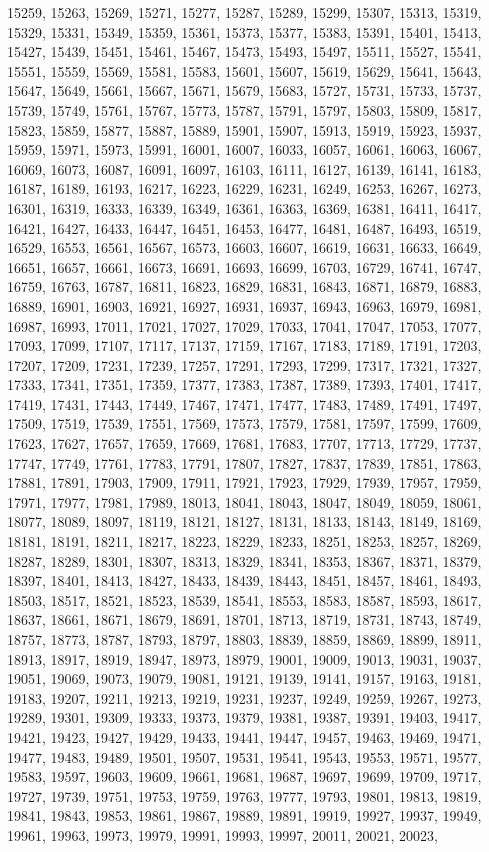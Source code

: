 \documentclass[10pt,twocolumn]{article}
\begin{document}
\begin{thebibliography}{9}
15259, 15263, 15269, 15271, 15277, 15287, 15289, 15299, 15307, 15313, 15319, 15329, 15331, 15349, 15359, 15361, 15373, 15377, 15383, 15391, 15401, 15413, 15427, 15439, 15451, 15461, 15467, 15473, 15493, 15497, 15511, 15527, 15541, 15551, 15559, 15569, 15581, 15583, 15601, 15607, 15619, 15629, 15641, 15643, 15647, 15649, 15661, 15667, 15671, 15679, 15683, 15727, 15731, 15733, 15737, 15739, 15749, 15761, 15767, 15773, 15787, 15791, 15797, 15803, 15809, 15817, 15823, 15859, 15877, 15887, 15889, 15901, 15907, 15913, 15919, 15923, 15937, 15959, 15971, 15973, 15991, 16001, 16007, 16033, 16057, 16061, 16063, 16067, 16069, 16073, 16087, 16091, 16097, 16103, 16111, 16127, 16139, 16141, 16183, 16187, 16189, 16193, 16217, 16223, 16229, 16231, 16249, 16253, 16267, 16273, 16301, 16319, 16333, 16339, 16349, 16361, 16363, 16369, 16381, 16411, 16417, 16421, 16427, 16433, 16447, 16451, 16453, 16477, 16481, 16487, 16493, 16519, 16529, 16553, 16561, 16567, 16573, 16603, 16607, 16619, 16631, 16633, 16649, 16651, 16657, 16661, 16673, 16691, 16693, 16699, 16703, 16729, 16741, 16747, 16759, 16763, 16787, 16811, 16823, 16829, 16831, 16843, 16871, 16879, 16883, 16889, 16901, 16903, 16921, 16927, 16931, 16937, 16943, 16963, 16979, 16981, 16987, 16993, 17011, 17021, 17027, 17029, 17033, 17041, 17047, 17053, 17077, 17093, 17099, 17107, 17117, 17137, 17159, 17167, 17183, 17189, 17191, 17203, 17207, 17209, 17231, 17239, 17257, 17291, 17293, 17299, 17317, 17321, 17327, 17333, 17341, 17351, 17359, 17377, 17383, 17387, 17389, 17393, 17401, 17417, 17419, 17431, 17443, 17449, 17467, 17471, 17477, 17483, 17489, 17491, 17497, 17509, 17519, 17539, 17551, 17569, 17573, 17579, 17581, 17597, 17599, 17609, 17623, 17627, 17657, 17659, 17669, 17681, 17683, 17707, 17713, 17729, 17737, 17747, 17749, 17761, 17783, 17791, 17807, 17827, 17837, 17839, 17851, 17863, 17881, 17891, 17903, 17909, 17911, 17921, 17923, 17929, 17939, 17957, 17959, 17971, 17977, 17981, 17989, 18013, 18041, 18043, 18047, 18049, 18059, 18061, 18077, 18089, 18097, 18119, 18121, 18127, 18131, 18133, 18143, 18149, 18169, 18181, 18191, 18211, 18217, 18223, 18229, 18233, 18251, 18253, 18257, 18269, 18287, 18289, 18301, 18307, 18313, 18329, 18341, 18353, 18367, 18371, 18379, 18397, 18401, 18413, 18427, 18433, 18439, 18443, 18451, 18457, 18461, 18493, 18503, 18517, 18521, 18523, 18539, 18541, 18553, 18583, 18587, 18593, 18617, 18637, 18661, 18671, 18679, 18691, 18701, 18713, 18719, 18731, 18743, 18749, 18757, 18773, 18787, 18793, 18797, 18803, 18839, 18859, 18869, 18899, 18911, 18913, 18917, 18919, 18947, 18973, 18979, 19001, 19009, 19013, 19031, 19037, 19051, 19069, 19073, 19079, 19081, 19121, 19139, 19141, 19157, 19163, 19181, 19183, 19207, 19211, 19213, 19219, 19231, 19237, 19249, 19259, 19267, 19273, 19289, 19301, 19309, 19333, 19373, 19379, 19381, 19387, 19391, 19403, 19417, 19421, 19423, 19427, 19429, 19433, 19441, 19447, 19457, 19463, 19469, 19471, 19477, 19483, 19489, 19501, 19507, 19531, 19541, 19543, 19553, 19571, 19577, 19583, 19597, 19603, 19609, 19661, 19681, 19687, 19697, 19699, 19709, 19717, 19727, 19739, 19751, 19753, 19759, 19763, 19777, 19793, 19801, 19813, 19819, 19841, 19843, 19853, 19861, 19867, 19889, 19891, 19919, 19927, 19937, 19949, 19961, 19963, 19973, 19979, 19991, 19993, 19997, 20011, 20021, 20023, 
\end{thebibliography}
\end{document}
